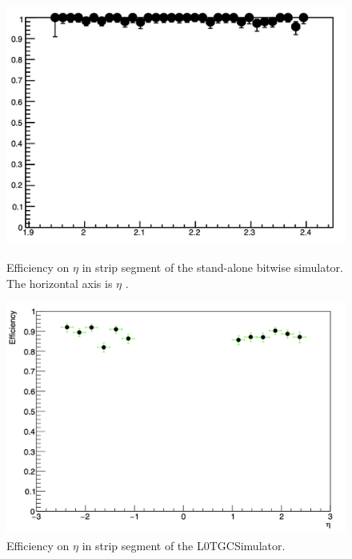 \begin{figure}[htbp]
  \begin{minipage}{0.485\textwidth}
    \centering
    \vspace{2mm}
    \includegraphics[width=\linewidth]{figs/chapter5/yamashita_strip_eff.png}
    \caption{Efficiency on $\eta$ in strip segment of the stand-alone bitwise simulator. The horizontal axis is $\eta$ \cite{yamashita}.}
    \label{fig:yama_strip}
  \end{minipage}
  \hfill
  \begin{minipage}{0.505\textwidth}
    \centering
    \includegraphics[width=\linewidth]{figs/chapter5/eff_strip_eta.png}
    \caption{Efficiency on $\eta$ in strip segment of the L0TGCSimulator.}
    \label{fig:eff_strip_eta}
  \end{minipage}
\end{figure}

